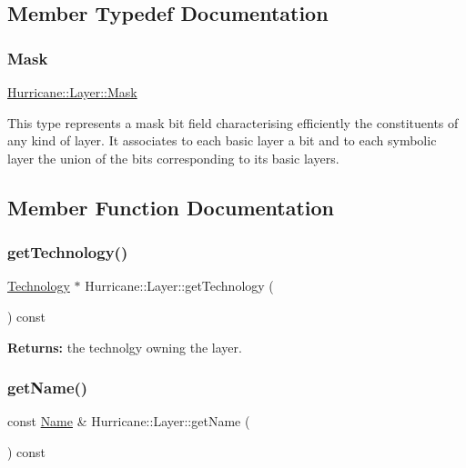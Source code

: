 \subsection{Member Typedef Documentation}
\mbox{\label{classHurricane_1_1Layer_af5277c670637bd5d910237e7afe01a91}} 
\subsubsection{\texorpdfstring{Mask}{Mask}}
{\footnotesize\ttfamily \hyperlink{classHurricane_1_1Layer_af5277c670637bd5d910237e7afe01a91}{Hurricane\+::\+Layer\+::\+Mask}}

This type represents a mask bit field characterising efficiently the constituents of any kind of layer. It associates to each basic layer a bit and to each symbolic layer the union of the bits corresponding to its basic layers. 

\subsection{Member Function Documentation}
\mbox{\label{classHurricane_1_1Layer_ae506b17bd7a245de622f8a8e9947629b}} 
\subsubsection{\texorpdfstring{get\+Technology()}{getTechnology()}}
{\footnotesize\ttfamily \hyperlink{classHurricane_1_1Technology}{Technology} $\ast$ Hurricane\+::\+Layer\+::get\+Technology (\begin{DoxyParamCaption}{ }\end{DoxyParamCaption}) const\hspace{0.3cm}{\ttfamily [inline]}}

{\bfseries Returns\+:} the technolgy owning the layer. \mbox{\label{classHurricane_1_1Layer_a3dc54f6efc60fddb8529599caa6b0f1f}} 
\subsubsection{\texorpdfstring{get\+Name()}{getName()}}
{\footnotesize\ttfamily const \hyperlink{classHurricane_1_1Name}{Name} \& Hurricane\+::\+Layer\+::get\+Name (\begin{DoxyParamCaption}{ }\end{DoxyParamCaption}) const\hspace{0.3cm}{\ttfamily [inline]}}

